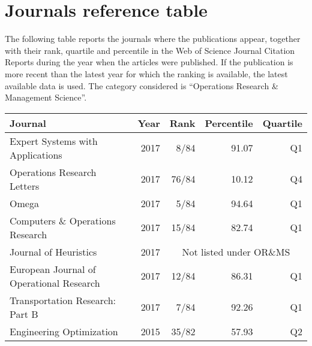 \section*{Journals reference table}

The following table reports the journals where the publications appear, together with their rank, quartile and percentile in the Web of Science Journal Citation Reports during the year when the articles were published.
If the publication is more recent than the latest year for which the ranking is available, the latest available data is used.
The category considered is ``Operations Research \& Management Science''.

\begin{center}
    \vspace{.5em}
    \begin{tabular}{lrrrr}
        {\bfseries Journal} & {\bfseries Year} & {\bfseries Rank} & {\bfseries Percentile} & {\bfseries Quartile} \\
        \hline
        Expert Systems with Applications & 2017 & 8/84 & 91.07 & Q1 \\
        Operations Research Letters & 2017 & 76/84 & 10.12 & Q4 \\
        Omega & 2017 & 5/84 & 94.64 & Q1 \\
        Computers \& Operations Research & 2017 & 15/84 & 82.74 & Q1 \\
        Journal of Heuristics & 2017 & \multicolumn{3}{c}{Not listed under OR\&MS} \\
        European Journal of Operational Research & 2017 & 12/84 & 86.31 & Q1 \\
        Transportation Research: Part B & 2017 & 7/84 & 92.26 & Q1 \\
        Engineering Optimization & 2015 & 35/82 & 57.93 & Q2 \\
    \end{tabular}
    \vspace{.5em}
\end{center}